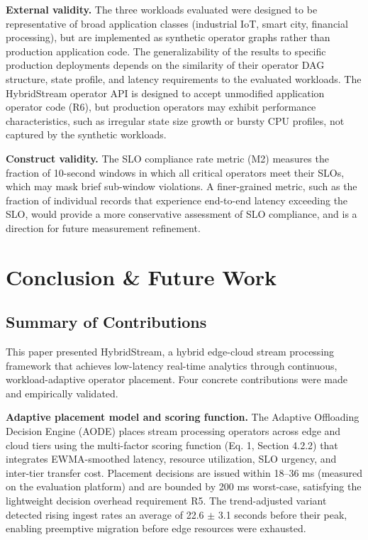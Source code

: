 \documentclass[preprint,review,12pt]{elsarticle}
\begin{document}
\textbf{External validity.} The three workloads evaluated were designed to be representative of broad application classes (industrial IoT, smart city, financial processing), but are implemented as synthetic operator graphs rather than production application code. The generalizability of the results to specific production deployments depends on the similarity of their operator DAG structure, state profile, and latency requirements to the evaluated workloads. The HybridStream operator API is designed to accept unmodified application operator code (R6), but production operators may exhibit performance characteristics, such as irregular state size growth or bursty CPU profiles, not captured by the synthetic workloads.

\textbf{Construct validity.} The SLO compliance rate metric (M2) measures the fraction of 10-second windows in which all critical operators meet their SLOs, which may mask brief sub-window violations. A finer-grained metric, such as the fraction of individual records that experience end-to-end latency exceeding the SLO, would provide a more conservative assessment of SLO compliance, and is a direction for future measurement refinement.



\section{Conclusion \& Future Work}\label{conclusion-future-work}

\subsection{Summary of Contributions}\label{summary-of-contributions}

This paper presented HybridStream, a hybrid edge-cloud stream processing framework that achieves low-latency real-time analytics through continuous, workload-adaptive operator placement. Four concrete contributions were made and empirically validated.

\textbf{Adaptive placement model and scoring function.} The Adaptive Offloading Decision Engine (AODE) places stream processing operators across edge and cloud tiers using the multi-factor scoring function (Eq. 1, Section 4.2.2) that integrates EWMA-smoothed latency, resource utilization, SLO urgency, and inter-tier transfer cost. Placement decisions are issued within 18--36 ms (measured on the evaluation platform) and are bounded by 200 ms worst-case, satisfying the lightweight decision overhead requirement R5. The trend-adjusted variant detected rising ingest rates an average of 22.6 $\pm$ 3.1 seconds before their peak, enabling preemptive migration before edge resources were exhausted.
\end{document}
